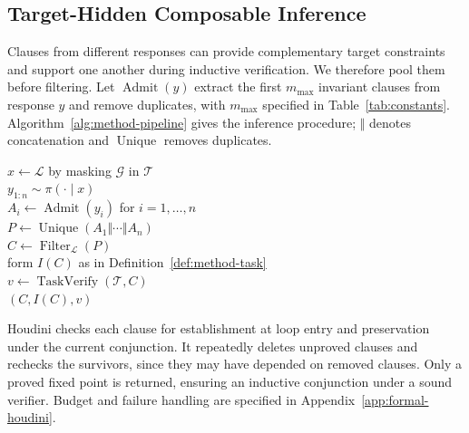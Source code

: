 \subsection{Target-Hidden Composable Inference}
\label{sec:method:core}
\label{sec:method:inference}

Clauses from different responses can provide complementary target
constraints and support one another during inductive verification.
We therefore pool them before filtering.  Let
\(\operatorname{Admit}(y)\) extract the first \(m_{\max}\) invariant clauses
from response \(y\) and remove duplicates, with \(m_{\max}\) specified in
Table~\ref{tab:constants}.  Algorithm~\ref{alg:method-pipeline} gives the
inference procedure; \(\Vert\) denotes concatenation and
\(\operatorname{Unique}\) removes duplicates.

\begin{algorithm}[H]
\caption{Rollout--decompose--pool--filter--compose}
\label{alg:method-pipeline}
\begin{algorithmic}
\algline \(x\leftarrow\mathcal L\) by masking \(\mathcal G\) in \(\mathcal T\)\\
\algline \(y_{1:n}\sim\pi(\cdot\mid x)\)\\
\algline \(A_i\leftarrow\operatorname{Admit}(y_i)\) for \(i=1,\ldots,n\)
  \\
\algline \(P\leftarrow\operatorname{Unique}(A_1\Vert\cdots\Vert A_n)\)
  \\
\algline \(C\leftarrow\operatorname{Filter}_{\mathcal L}(P)\)\\
\algline form \(I(C)\) as in Definition~\ref{def:method-task}\\
\algline \(v\leftarrow\operatorname{TaskVerify}(\mathcal T,C)\)\\
\algline {} \((C,I(C),v)\)\\
\end{algorithmic}
\end{algorithm}

Houdini checks each clause for establishment at loop entry and preservation
under the current conjunction.  It repeatedly deletes unproved clauses and
rechecks the survivors, since they may have depended on removed clauses.
Only a proved fixed point is returned, ensuring an inductive conjunction
under a sound verifier.  Budget and failure handling are specified in
Appendix~\ref{app:formal-houdini}.

